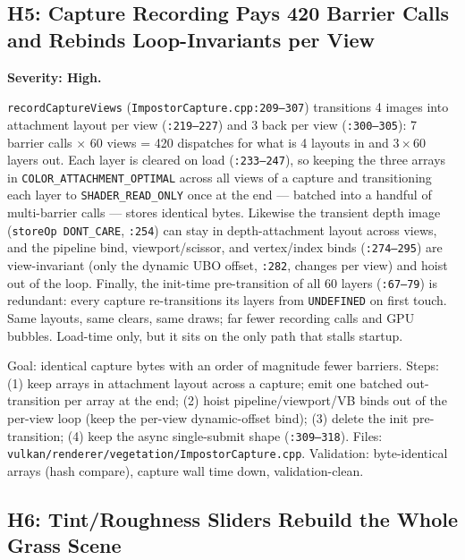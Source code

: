 \documentclass[11pt,a4paper]{article}
\begin{document}
\subsection{H5: Capture Recording Pays 420 Barrier Calls and Rebinds Loop-Invariants per View}

\textbf{Severity: High.}

\texttt{recordCaptureViews} (\texttt{ImpostorCapture.cpp:209--307})
transitions 4 images into attachment layout per view (\texttt{:219--227})
and 3 back per view (\texttt{:300--305}): 7 barrier calls $\times$ 60 views
= 420 dispatches for what is 4 layouts in and $3 \times 60$ layers out.
Each layer is cleared on load (\texttt{:233--247}), so keeping the three
arrays in \texttt{COLOR\_ATTACHMENT\_OPTIMAL} across all views of a capture
and transitioning each layer to \texttt{SHADER\_READ\_ONLY} once at the end
--- batched into a handful of multi-barrier calls --- stores identical
bytes. Likewise the transient depth image (\texttt{storeOp DONT\_CARE},
\texttt{:254}) can stay in depth-attachment layout across views, and the
pipeline bind, viewport/scissor, and vertex/index binds (\texttt{:274--295})
are view-invariant (only the dynamic UBO offset, \texttt{:282}, changes per
view) and hoist out of the loop. Finally, the init-time pre-transition of
all 60 layers (\texttt{:67--79}) is redundant: every capture re-transitions
its layers from \texttt{UNDEFINED} on first touch. Same layouts, same
clears, same draws; far fewer recording calls and GPU bubbles. Load-time
only, but it sits on the only path that stalls startup.

\begin{tcolorbox}[promptbox={Prompt --- H5: batched capture transitions, hoisted binds}]
Goal: identical capture bytes with an order of magnitude fewer barriers.
Steps: (1) keep arrays in attachment layout across a capture; emit one
batched out-transition per array at the end; (2) hoist pipeline/viewport/VB
binds out of the per-view loop (keep the per-view dynamic-offset bind);
(3) delete the init pre-transition; (4) keep the async single-submit shape
(\texttt{:309--318}). Files:
\texttt{vulkan/renderer/vegetation/ImpostorCapture.cpp}. Validation:
byte-identical arrays (hash compare), capture wall time down,
validation-clean.
\end{tcolorbox}

\subsection{H6: Tint/Roughness Sliders Rebuild the Whole Grass Scene}
\end{document}
